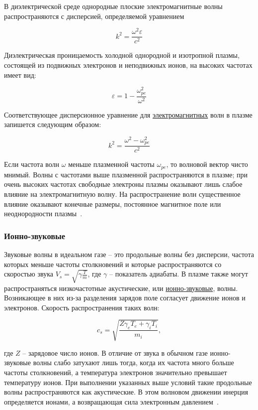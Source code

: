 \documentclass[10pt, a4paper]{article}
\begin{document}
В диэлектрической среде однородные плоские электромагнитные волны распространяются с дисперсией, определяемой уравнением 

\begin{equation*}
	k^2=\frac{\omega^2\varepsilon}{c^2}
\end{equation*}

Диэлектрическая проницаемость холодной однородной и изотропной плазмы, состоящей из подвижных электронов и неподвижных ионов, на высоких частотах имеет вид:

\begin{equation*}
	\varepsilon = 1-\frac{\omega_{pe}^2}{\omega^2}
\end{equation*}

Соответствующее дисперсионное уравнение для \uline{электромагнитных} волн в плазме запишется следующим образом:

\begin{equation*}
	k^2 = \frac{\omega^2-\omega_{pe}^2}{c^2}
\end{equation*}

Если частота волн $\omega$ меньше плазменной частоты $\omega_{pe}$, то волновой вектор чисто мнимый. Волны с частотами выше плазменной распространяются в плазме; при очень высоких частотах свободные электроны плазмы оказывают лишь слабое влияние на электромагнитную волну. На распространение волн существенное влияние оказывают конечные размеры, постоянное магнитное поле или неоднородности плазмы~\cite{kroll}.

\subsubsection{Ионно-звуковые}

Звуковые волны в идеальном газе -- это продольные волны без  дисперсии, частота которых меньше частоты столкновений и которые  распространяются со скоростью звука $V_s=\sqrt{\gamma\frac{T}{m}}$, где $\gamma$ -- показатель адиабаты. В плазме также могут  распространяться низкочастотные акустические, или \uline{ионно-звуковые}, волны.  Возникающее в них из-за разделения зарядов поле согласует движение ионов и электронов. Скорость распространения таких волн:

\begin{equation*}
	c_s = \sqrt{\frac{Z\gamma_eT_e+\gamma_iT_i}{m_i}},
\end{equation*}

где $Z$ -- зарядовое число ионов. В отличие от звука в обычном газе ионно-звуковые волны слабо затухают лишь тогда, когда их частота много больше частоты столкновений, а температура электронов значительно превышает температуру ионов. При выполнении указанных выше условий такие продольные волны распространяются как акустические. В этом волновом движении инерция определяется ионами, а возвращающая сила электронным давлением~\cite{kroll}.
\end{document}
